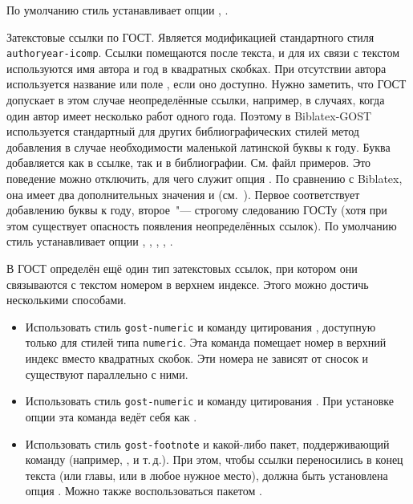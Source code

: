 \documentclass[11pt,a4paper,headings=small,numbers=enddot]{ltxdockit}[2011/03/25]
\newcommand*{\biblatex}{Biblatex\xspace}
\newcommand*{\biblatexgost}{Biblatex-GOST\xspace}
\newcommand{\bibsty}{\texttt}
\begin{document}
\begin{marglist}
По умолчанию стиль устанавливает опции , .

\item[gost-authoryear]
Затекстовые ссылки по ГОСТ. Является модификацией стандартного 
стиля \bibsty{authoryear-icomp}. Ссылки помещаются после текста, и для их связи 
с текстом используются имя автора и год в квадратных скобках. При отсутствии автора
используется название или поле , если оно доступно. Нужно заметить, что ГОСТ 
допускает в этом случае неопределённые ссылки, например, в случаях, когда один автор имеет несколько 
работ одного года. Поэтому в \biblatexgost используется стандартный для других библиографических стилей 
метод добавления в случае необходимости маленькой латинской буквы к году. Буква добавляется как в 
ссылке, так и в библиографии. См. файл примеров. Это поведение можно отключить, для чего служит опция 
.
По сравнению с \biblatex, она имеет два дополнительных значения  и 
 (см.~). Первое соответствует добавлению буквы к году, 
второе~"--- строгому 
следованию ГОСТу (хотя при этом существует опасность появления неопределённых ссылок).
По умолчанию стиль устанавливает опции , 
,
,
,
. 

\end{marglist}

В ГОСТ определён ещё один тип затекстовых ссылок, при котором они 
связываются с текстом номером в верхнем индексе. Этого можно достичь несколькими способами. 

\begin{itemize}
\item Использовать стиль \bibsty{gost-numeric} и команду цитирования  
, доступную только для стилей типа \bibsty{numeric}. Эта команда
помещает номер в верхний индекс вместо квадратных скобок. Эти номера не зависят от 
сносок  и существуют параллельно с ними.
\item Использовать стиль \bibsty{gost-numeric} и команду цитирования
. При установке опции  эта команда ведёт себя 
как .
\item Использовать стиль \bibsty{gost-footnote} и какой-либо пакет, поддерживающий команду  (например, ,  и т.\,д.). 
При этом, чтобы ссылки переносились в конец текста (или главы, или в любое 
нужное место), должна быть установлена
опция . Можно также воспользоваться 
пакетом .
\end{itemize}
\end{document}
